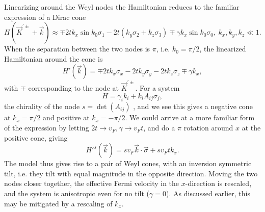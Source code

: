 Linearizing around the Weyl nodes the Hamiltonian reduces to the familiar expression of a Dirac cone
\begin{equation}
  \label{eq:7}
  H(\vec{K} ^{'\pm} + \vec{k}) \approx \mp 2 t k_{x} \sin k_{0} \sigma_{1} - 2 t (k_{y} \sigma_{2} + k_{z} \sigma_{3}) \mp \gamma k_{x} \sin k_{0} \sigma_{0}, \: k_{x}, k_{y}, k_{z} \ll 1.
\end{equation}
When the separation between the two nodes is \(\pi\), i.e. \(k_{0} = \pi/ 2 \), the linearized Hamiltonian around the cone is
\begin{equation}
  \label{eq:8}
  H'(\vec{k}) = \mp 2 t k_{x} \sigma_{x} - 2t k_{y} \sigma_{y} - 2 t k_{z} \sigma_{z} \mp \gamma k_{x},
\end{equation}
with \( \mp \) corresponding to the node at \( \vec{K}^{' \pm} \).
For a system
\begin{equation}
  \label{eq:155}
  H = \gamma_i k_i + k_i A_{ij} \sigma_j,
\end{equation}
the chirality of the node \( s = \det(A_{ij}) \) \cite{mccormickMinimalModelsTopological2017}, and we see this gives a negative cone at \( k_x = \pi /2 \) and positive at \( k_x = -\pi /2 \).
We could arrive at a more familiar form of the expression by letting \( 2 t \to v_F, \gamma \to v_F t \), and do a \( \pi \) rotation around \( x \) at the positive cone, giving
\begin{equation}
  \label{eq:158}
  H'^{s}(\vec{k}) = s v_F \vec{k} \cdot \vec{\sigma} + s v_F t k_x.
\end{equation}
The model thus gives rise to a pair of Weyl cones, with an inversion symmetric tilt, i.e. they tilt with equal magnitude in the opposite direction.
Moving the two nodes closer together, the effective Fermi velocity in the \(x\)-direction is rescaled, and the system is anisotropic even for no tilt (\(\gamma=0\)).
As discussed earlier, this may be mitigated by a rescaling of \( k_x \).


